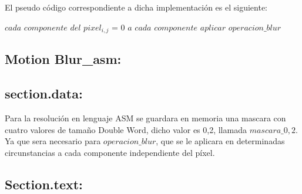 \documentclass[a4paper]{article}
\begin{document}
El pseudo código correspondiente a dicha implementación es el siguiente: 

\vspace{0.4cm}
\begin{algorithmic}[1]
					\State  $cada$ $componente$ $del$ $pixel_{i,j}$ = 0
				\Else
					\State $a$ $cada$ $componente$ $aplicar$ $operacion\_blur$
				\EndIf		        
        
        		\EndFor
         \EndFor            
\end{algorithmic} 


\subsection{Motion Blur\_asm:}


\subsection*{section.data:}

Para la resolución en lenguaje ASM se guardara en memoria una mascara con cuatro valores de tamaño Double Word, dicho valor es 0,2, llamada $mascara\_0,2$. Ya que sera necesario para $operacion\_blur$, que se le aplicara en determinadas circunstancias a cada componente independiente del píxel.

\subsection*{Section.text:}
\end{document}
